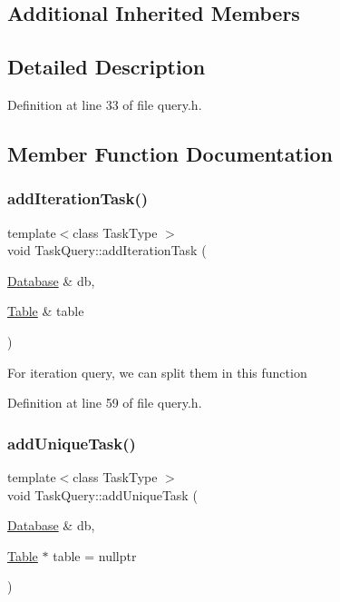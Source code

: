\subsection*{Additional Inherited Members}


\subsection{Detailed Description}


Definition at line 33 of file query.\+h.



\subsection{Member Function Documentation}
\mbox{\label{class_task_query_a9432212e101b6b393c13cf93e1211755}} 
\subsubsection{\texorpdfstring{add\+Iteration\+Task()}{addIterationTask()}}
{\footnotesize\ttfamily template$<$class Task\+Type $>$ \\
void Task\+Query\+::add\+Iteration\+Task (\begin{DoxyParamCaption}\item[{\hyperlink{class_database}{Database} \&}]{db,  }\item[{\hyperlink{class_table}{Table} \&}]{table }\end{DoxyParamCaption})\hspace{0.3cm}{\ttfamily [inline]}}

For iteration query, we can split them in this function 

Definition at line 59 of file query.\+h.

\mbox{\label{class_task_query_afb2a8505209d5f521570305f60203b2d}} 
\subsubsection{\texorpdfstring{add\+Unique\+Task()}{addUniqueTask()}}
{\footnotesize\ttfamily template$<$class Task\+Type $>$ \\
void Task\+Query\+::add\+Unique\+Task (\begin{DoxyParamCaption}\item[{\hyperlink{class_database}{Database} \&}]{db,  }\item[{\hyperlink{class_table}{Table} $\ast$}]{table = {\ttfamily nullptr} }\end{DoxyParamCaption})\hspace{0.3cm}{\ttfamily [inline]}}

